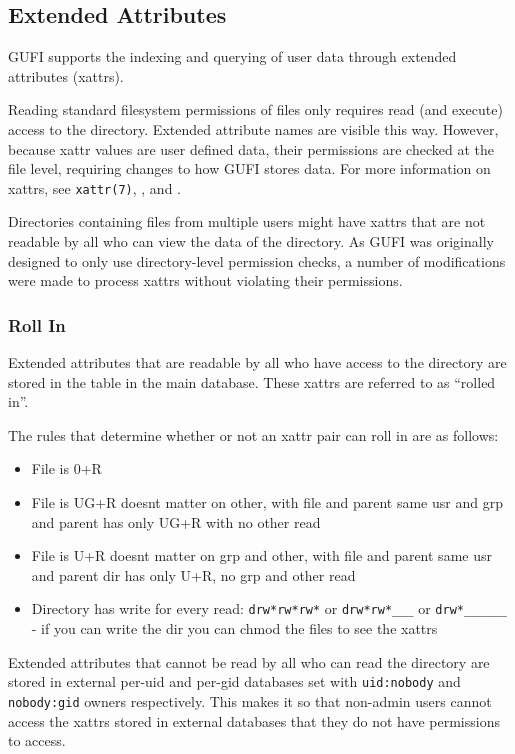 \subsection{Extended Attributes}
\label{sec:xattrs}
GUFI supports the indexing and querying of user data through extended
attributes (xattrs).

Reading standard filesystem permissions of files only requires read
(and execute) access to the directory. Extended attribute names are
visible this way. However, because xattr values are user defined data,
their permissions are checked at the file level, requiring changes to
how GUFI stores data. For more information on xattrs, see
\texttt{xattr(7)}, \listxattr, and \getxattr.

Directories containing files from multiple users might have xattrs
that are not readable by all who can view the \lstat data of the
directory. As GUFI was originally designed to only use directory-level
permission checks, a number of modifications were made to process
xattrs without violating their permissions.

\subsubsection{Roll In}
Extended attributes that are readable by all who have access to the
directory are stored in the \xattrspwd table in the main
database. These xattrs are referred to as ``rolled in''.

The rules that determine whether or not an xattr pair can roll in are
as follows:

\begin{itemize}
\item File is 0+R
\item File is UG+R doesnt matter on other, with file and parent same
  usr and grp and parent has only UG+R with no other read
\item File is U+R doesnt matter on grp and other, with file and parent
  same usr and parent dir has only U+R, no grp and other read
\item Directory has write for every read:
    \texttt{drw*rw*rw*} or \texttt{drw*rw*\_\_\_} or
    \texttt{drw*\_\_\_\_\_\_} - if you can write the dir you can
    chmod the files to see the xattrs
\end{itemize}

Extended attributes that cannot be read by all who can read the
directory are stored in external per-uid and per-gid databases set
with \texttt{uid:nobody} and \texttt{nobody:gid} owners
respectively. This makes it so that non-admin users cannot access the
xattrs stored in external databases that they do not have permissions
to access.

